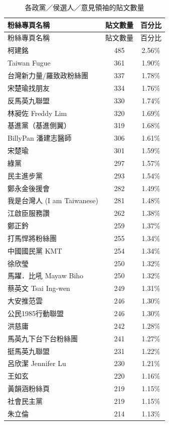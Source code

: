\documentclass[letterpaper, 10pt, conference]{ieeeconf}   %
\begin{document}
\begin{CJK}{UTF8}{bsmi}
\onecolumn

\begin{longtable}[c]{@{}lcc@{}}
\caption{各政黨／侯選人／意見領袖的貼文數量}
\label{t1}\\
\toprule
粉絲專頁名稱 & 貼文數量 & 百分比 \\* \midrule
\endfirsthead
\toprule
粉絲專頁名稱 & 貼文數量 & 百分比 \\* \midrule
\endhead
%
\bottomrule
\endfoot
%
\endlastfoot
%
柯建銘 & 485 & 2.56\% \\
Taiwan Fugue & 361 & 1.90\% \\
台灣新力量/羅致政粉絲團 & 337 & 1.78\% \\
宋楚瑜找朋友 & 334 & 1.76\% \\
反馬英九聯盟 & 330 & 1.74\% \\
林昶佐 Freddy Lim & 320 & 1.69\% \\
基進黨（基進側翼） & 319 & 1.68\% \\
BillyPan 潘建志醫師 & 306 & 1.61\% \\
宋楚瑜 & 301 & 1.59\% \\
綠黨 & 297 & 1.57\% \\
民主進步黨 & 293 & 1.54\% \\
鄭永金後援會 & 282 & 1.49\% \\
我是台灣人 (I am Taiwanese) & 281 & 1.48\% \\
江啟臣服務讚 & 262 & 1.38\% \\
鄭正鈐 & 259 & 1.37\% \\
打馬悍將粉絲團 & 255 & 1.34\% \\
中國國民黨 KMT & 254 & 1.34\% \\
徐欣瑩 & 250 & 1.32\% \\
馬躍．比吼 Mayaw Biho & 250 & 1.32\% \\
蔡英文 Tsai Ing-wen & 249 & 1.31\% \\
大安推范雲 & 246 & 1.30\% \\
公民1985行動聯盟 & 246 & 1.30\% \\
洪慈庸 & 242 & 1.28\% \\
馬英九下台下台粉絲團 & 241 & 1.27\% \\
挺馬英九聯盟 & 231 & 1.22\% \\
呂欣潔 Jennifer Lu & 230 & 1.21\% \\
王如玄 & 220 & 1.16\% \\
黃韻涵粉絲頁 & 219 & 1.15\% \\
社會民主黨 & 219 & 1.15\% \\
朱立倫 & 214 & 1.13\% \\

\end{longtable}
\end{CJK}
\end{document}
